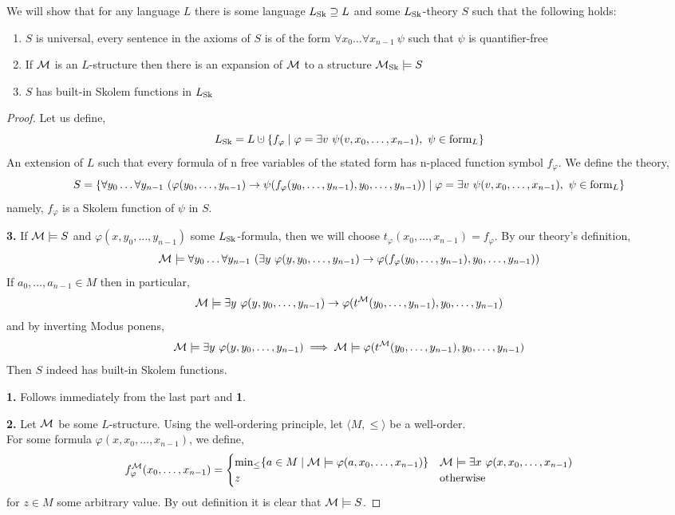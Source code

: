 \subquestion{}
We will show that for any language $L$ there is some language $L_{\operatorname{Sk}} \supseteq L$ and some $L_{\operatorname{Sk}}$-theory $S$ such that the following holds:
\begin{enumerate}
	\item $S$ is universal,
		every sentence in the axioms of $S$ is of the form $\forall x_0 \ldots \forall x_{n - 1}\ \psi$ such that $\psi$ is quantifier-free
	\item If $\mathcal{M}$ is an $L$-structure then there is an expansion of $\mathcal{M}$ to a structure $\mathcal{M}_{\operatorname{Sk}} \models S$
	\item $S$ has built-in Skolem functions in $L_{\operatorname{Sk}}$
\end{enumerate}
\begin{proof}
	Let us define,
	\[
		L_{\sk}
		= L \cupdot \{ f_{\varphi} \mid \varphi = \exists v\ \psi(v, x_0, \ldots, x_{n - 1}),\ \psi \in \form_L \}
	\]
	An extension of $L$ such that every formula of n free variables of the stated form has n-placed function symbol $f_{\varphi}$.
	We define the theory,
	\[
		S
		= \{ \forall y_0 \ldots \forall y_{n - 1}\ (\varphi(y_0, \ldots, y_{n - 1}) \to \psi(f_{\varphi}(y_0, \ldots, y_{n - 1}), y_0, \ldots, y_{n - 1}))
		\mid \varphi = \exists v\ \psi(v, x_0, \ldots, x_{n - 1}),\ \psi \in \operatorname{form}_L \}
	\]
	namely, $f_{\varphi}$ is a Skolem function of $\psi$ in $S$.

	\textbf{3.}
	If $\mathcal{M} \models S$ and $\varphi(x, y_0, \ldots, y_{n - 1})$ some $L_{\operatorname{Sk}}$-formula, then we will choose $t_{\varphi}(x_0, \ldots, x_{n - 1}) = f_{\varphi}$.
	By our theory's definition,
	\[
		\mathcal{M} \models \forall y_0 \ldots \forall y_{n - 1}\ (\exists y\ \varphi(y, y_0, \ldots, y_{n - 1}) \to \varphi(f_{\varphi}(y_0, \ldots, y_{n - 1}), y_0, \ldots, y_{n - 1}))
	\]
	If $a_0, \ldots, a_{n - 1} \in M$ then in particular,
	\[
		\Mm \models \exists y\ \varphi(y, y_0, \ldots, y_{n - 1}) \to \varphi(t^\Mm(y_0, \ldots, y_{n - 1}), y_0, \ldots, y_{n - 1})
	\]
	and by inverting Modus ponens,
	\[
		\mathcal{M} \models \exists y\ \varphi(y, y_0, \ldots, y_{n - 1})
		\implies \mathcal{M} \models \varphi(t^{\mathcal{M}}(y_0, \ldots, y_{n - 1}), y_0, \ldots, y_{n - 1})
	\]
	Then $S$ indeed has built-in Skolem functions.

	\textbf{1.}
	Follows immediately from the last part and \textbf{1}.

	\textbf{2.}
	Let $\mathcal{M}$ be some $L$-structure.
	Using the well-ordering principle, let $\langle M, \le \rangle$ be a well-order. \\
	For some formula $\varphi(x, x_0, \ldots, x_{n - 1})$, we define,
	\[
		f_{\varphi}^{\mathcal{M}}(x_0, \ldots, x_{n - 1})
		= \begin{cases}
			\min_{\le} \{ a \in M \mid \mathcal{M} \models \varphi(a, x_0, \ldots, x_{n - 1}) \} & \mathcal{M} \models \exists x\ \varphi(x, x_0, \ldots, x_{n - 1}) \\
			z & \text{otherwise}
		\end{cases}
	\]
	for $z \in M$ some arbitrary value.
	By out definition it is clear that $\mathcal{M} \models S$.
\end{proof}

